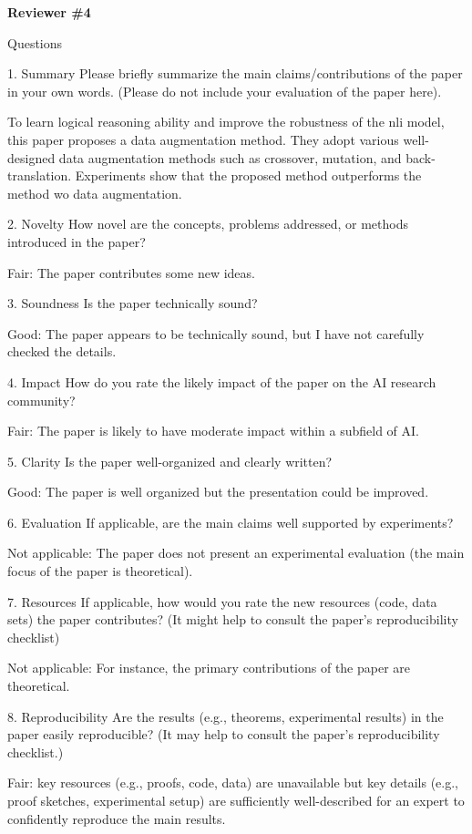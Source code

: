 \documentclass{article}
\begin{document}
\textbf{\Large{Reviewer \#4}}

Questions

1. {Summary} Please briefly summarize the main claims/contributions of the paper in your own words. (Please do not include your evaluation of the paper here).

To learn logical reasoning ability and improve the robustness of the nli model, 
this paper proposes a data augmentation method. 
They adopt various well-designed data augmentation methods such as crossover, 
mutation, and back-translation. 
Experiments show that the proposed method 
outperforms the method w\/o data augmentation.

2. {Novelty} How novel are the concepts, problems addressed, or methods introduced in the paper?

Fair: The paper contributes some new ideas.

3. {Soundness} Is the paper technically sound?

Good: The paper appears to be technically sound, but I have not carefully checked the details.

4. {Impact} How do you rate the likely impact of the paper on the AI research community?

Fair: The paper is likely to have moderate impact within a subfield of AI.

5. {Clarity} Is the paper well-organized and clearly written?

Good: The paper is well organized but the presentation could be improved.

6. {Evaluation} If applicable, are the main claims well supported by experiments?

Not applicable: The paper does not present an experimental 
evaluation (the main focus of the paper is theoretical).

7. {Resources} If applicable, how would you rate the new resources 
(code, data sets) the paper contributes? (It might help to consult the paper’s reproducibility checklist)

Not applicable: For instance, the primary contributions of the paper are theoretical.

8. {Reproducibility} Are the results (e.g., theorems, experimental results) in the paper easily reproducible? (It may help to consult the paper’s reproducibility checklist.)

Fair: key resources (e.g., proofs, code, data) are unavailable but key details (e.g., proof sketches, experimental setup) are sufficiently well-described for an expert to confidently reproduce the main results.
\end{document}

